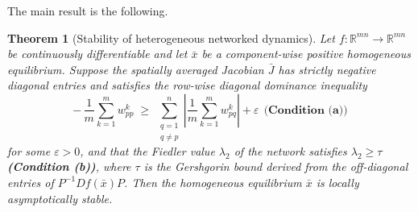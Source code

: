 \documentclass[12pt,a4paper]{article}
\newtheorem{theorem}{Theorem}[section]
\theoremstyle{definition}
\begin{document}
The main result is the following.

\begin{theorem}[Stability of heterogeneous networked dynamics]
\label{thm:main}
Let \(f:\mathbb{R}^{mn} \to \mathbb{R}^{mn}\) be continuously differentiable and let \(\bar{x}\) be a component-wise positive homogeneous equilibrium. Suppose the spatially averaged Jacobian \(\bar{J}\) has strictly negative diagonal entries and satisfies the row-wise diagonal dominance inequality
\begin{equation*}
-\,\frac{1}{m}\sum_{k=1}^{m} w^{k}_{pp}
\;\geq\;
\sum_{\substack{q=1\\q\neq p}}^{n}
\left|\frac{1}{m}\sum_{k=1}^{m} w^{k}_{pq}\right|
+ \varepsilon ~~\textbf{(Condition (a))}
\end{equation*}
for some \(\varepsilon > 0\), and that the Fiedler value \(\lambda_2\) of the network satisfies \(\lambda_2 \ge \tau\) \textbf{(Condition (b))}, where \(\tau\) is the Gershgorin bound derived from the off-diagonal entries of \(P^{-1}Df(\bar{x})P\). Then the homogeneous equilibrium \(\bar{x}\) is locally asymptotically stable.
\end{theorem}
\end{document}

